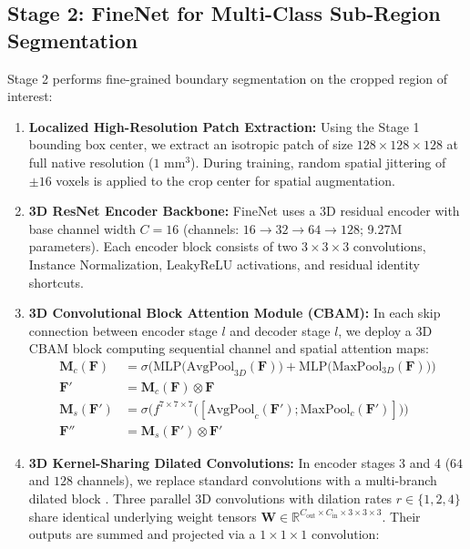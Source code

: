 \documentclass[12pt, a4paper]{article}
\begin{document}
\subsection{Stage 2: FineNet for Multi-Class Sub-Region Segmentation}
Stage 2 performs fine-grained boundary segmentation on the cropped region of interest:
\begin{enumerate}[leftmargin=*, itemsep=4pt]
    \item \textbf{Localized High-Resolution Patch Extraction:} Using the Stage 1 bounding box center, we extract an isotropic patch of size $128 \times 128 \times 128$ at full native resolution ($1 \text{ mm}^3$). During training, random spatial jittering of $\pm 16$ voxels is applied to the crop center for spatial augmentation.
    \item \textbf{3D ResNet Encoder Backbone:} FineNet uses a 3D residual encoder with base channel width $C=16$ (channels: $16 \to 32 \to 64 \to 128$; 9.27M parameters). Each encoder block consists of two $3 \times 3 \times 3$ convolutions, Instance Normalization, LeakyReLU activations, and residual identity shortcuts.
    \item \textbf{3D Convolutional Block Attention Module (CBAM):} In each skip connection between encoder stage $l$ and decoder stage $l$, we deploy a 3D CBAM block \cite{woo2018cbam, zhu2024improvedunet} computing sequential channel and spatial attention maps:
    \begin{align}
        \mathbf{M}_c(\mathbf{F}) &= \sigma\Big(\text{MLP}\big(\text{AvgPool}_{3D}(\mathbf{F})\big) + \text{MLP}\big(\text{MaxPool}_{3D}(\mathbf{F})\big)\Big) \\
        \mathbf{F}' &= \mathbf{M}_c(\mathbf{F}) \otimes \mathbf{F} \\
        \mathbf{M}_s(\mathbf{F}') &= \sigma\Big(f^{7\times 7\times 7}\big([\text{AvgPool}_c(\mathbf{F}'); \text{MaxPool}_c(\mathbf{F}')]\big)\Big) \\
        \mathbf{F}'' &= \mathbf{M}_s(\mathbf{F}') \otimes \mathbf{F}'
    \end{align}
    \item \textbf{3D Kernel-Sharing Dilated Convolutions:} In encoder stages 3 and 4 ($64$ and $128$ channels), we replace standard convolutions with a multi-branch dilated block \cite{guan2023multiview}. Three parallel 3D convolutions with dilation rates $r \in \{1, 2, 4\}$ share identical underlying weight tensors $\mathbf{W} \in \mathbb{R}^{C_{\text{out}} \times C_{\text{in}} \times 3 \times 3 \times 3}$. Their outputs are summed and projected via a $1 \times 1 \times 1$ convolution:

\end{enumerate}
\end{document}
